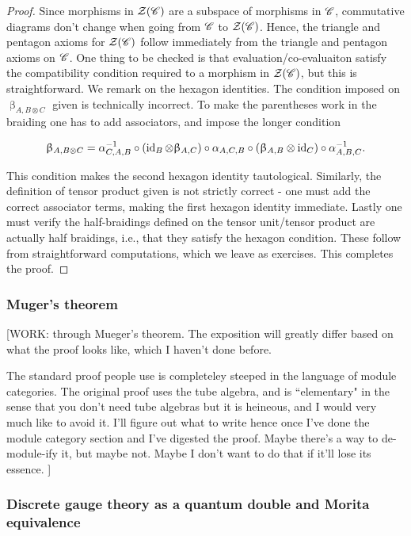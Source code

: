 \begin{proof} Since morphisms in $\mathcal{Z}(\mathscr{C})$ are a subspace of morphisms in $\mathscr{C}$, commutative diagrams don't change when going from $\mathscr{C}$ to $\mathcal{Z}(\mathscr{C})$. Hence, the triangle and pentagon axioms for $\mathcal{Z}(\mathscr{C})$ follow immediately from the triangle and pentagon axioms on $\mathscr{C}$. One thing to be checked is that evaluation/co-evaluaiton satisfy the compatibility condition required to a morphism in $\mathcal{Z}(\mathscr{C})$, but this is straightforward. We remark on the hexagon identities. The condition imposed on $\upbeta_{A,B\otimes C}$ given is technically incorrect. To make the parentheses work in the braiding one has to add associators, and impose the longer condition

$$\upbeta_{A,B\otimes C}=\alpha_{C,A,B}^{-1}\circ \left(\operatorname{id}_{B}\otimes \upbeta_{A,C}\right)\circ \alpha_{A,C,B}\circ\left(\upbeta_{A,B}\otimes \operatorname{id}_C\right)\circ \alpha^{-1}_{A,B,C}.$$

This condition makes the second hexagon identity tautological. Similarly, the definition of tensor product given is not strictly correct - one must add the correct associator terms, making the first hexagon identity immediate. Lastly one must verify the half-braidings defined on the tensor unit/tensor product are actually half braidings, i.e., that they satisfy the hexagon condition. These follow from straightforward computations, which we leave as exercises. This completes the proof.

\end{proof}

\subsubsection{Muger's theorem}

[WORK: through Mueger's theorem. The exposition will greatly differ based on what the proof looks like, which I haven't done before.

The standard proof people use is completeley steeped in the language of module categories. The original proof uses the tube algebra, and is ``elementary" in the sense that you don't need tube algebras but it is heineous, and I would very much like to avoid it. I'll figure out what to write hence once I've done the module category section and I've digested the proof. Maybe there's a way to de-module-ify it, but maybe not. Maybe I don't want to do that if it'll lose its essence.
]

\subsubsection{Discrete gauge theory as a quantum double and Morita equivalence}

